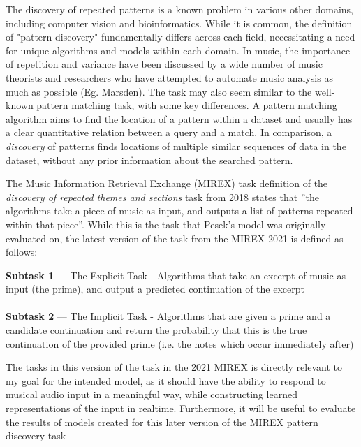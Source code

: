 \documentclass[../main.tex]{subfiles}
\begin{document}
The discovery of repeated patterns is a known problem in various other domains, including computer vision and bioinformatics. While it is common, the definition of "pattern discovery" fundamentally differs across each field, necessitating a need for unique algorithms and models within each domain. In music, the importance of repetition and variance have been discussed by a wide number of music theorists and researchers who have attempted to automate music analysis as much as possible (Eg. Marsden).  The task may also seem similar to the well-known pattern matching task, with some key differences. A pattern matching algorithm aims to find the location of a pattern within a dataset and usually has a clear quantitative relation between a query and a match. In comparison, a \textit{discovery} of patterns finds locations of multiple similar sequences of data in the dataset, without any prior information about the searched pattern. 

The Music Information Retrieval Exchange (MIREX) task definition of the \textit{discovery of repeated themes and sections} task from 2018 states that ”the algorithms take a piece of music as input, and outputs a list of patterns repeated within that piece”. While this is the task that Pesek's model was originally evaluated on, the latest version of the task from the MIREX 2021 is defined as follows:

\begin{displayquote}
\textbf{Subtask 1} — The Explicit Task - Algorithms that take an excerpt of music as input (the prime), and output a predicted continuation of the excerpt\\
\\\textbf{Subtask 2} — The Implicit Task - Algorithms that are given a prime and a candidate continuation and return the probability that this is the true continuation of the provided prime (i.e. the notes which occur immediately after)
\end{displayquote}

The tasks in this version of the task in the 2021 MIREX is directly relevant to my goal for the intended model, as it should have the ability to respond to musical audio input in a meaningful way, while constructing learned representations of the input in realtime. Furthermore, it will be useful to evaluate the results of models created for this later version of the MIREX pattern discovery task
\end{document}
